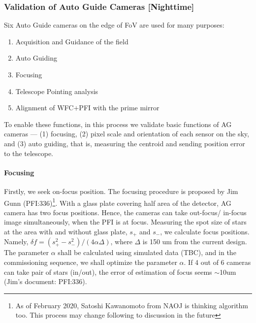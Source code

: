 \subsubsection{Validation of Auto Guide Cameras [Nighttime]}\label{secflow:AGCfunc}

Six Auto Guide cameras on the edge of FoV are used for many purposes:
\begin{enumerate}
\item Acquisition and Guidance of the field 
\item Auto Guiding
\item Focusing
\item Telescope Pointing analysis
\item Alignment of WFC$+$PFI with the prime mirror
\end{enumerate}

To enable these functions, in this process we validate basic functions of AG cameras --- (1) focusing, (2) pixel scale and orientation of each sensor on the sky, and (3) auto guiding, that is, measuring the centroid and sending position error to the telescope.

\paragraph{Focusing}
Firstly, we seek on-focus position.
The focusing procedure is proposed by Jim Gunn (PFI:336)\footnote{As of February 2020, Satoshi Kawanomoto from NAOJ is thinking algorithm too. This process may change following to discussion in the future}.
With a glass plate covering half area of the detector, AG camera has two focus positions.
Hence, the cameras can take out-focus/ in-focus image simultaneously, when the PFI is at focus.
Measuring the spot size of stars at the area with and without glass plate, $s_+$ and $s_-$, we calculate focus positions.
Namely, $\delta f = (s_+^2 - s_-^2)/(4 \alpha \Delta)$, where $\Delta$ is 150 um from the current design.
The parameter $\alpha$ shall be calculated using simulated data (TBC), and in the commissioning sequence, we shall optimize the parameter $\alpha$.
If 4 out of 6 cameras can take pair of stars (in/out), the error of estimation of focus seems $\sim$10um (Jim's document: PFI:336).

